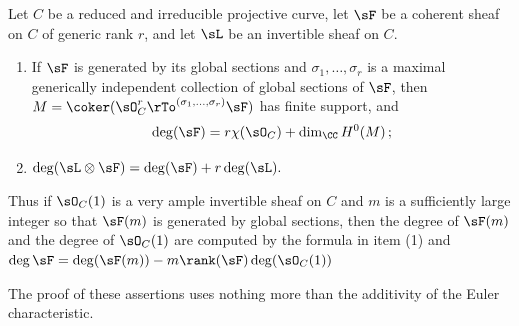 \begin{fact} Let $C$ be a reduced and irreducible projective curve, let $\sF$ be a coherent sheaf on $C$ of generic rank $r$, and let $\sL$ be an invertible sheaf on $C$.
\begin{enumerate}
\item If $\sF$ is generated by its global sections and $\sigma_1,\dots, \sigma_r$ is a maximal generically independent
collection of global sections of $\sF$,  then $M = \coker(\sO_C^r \rTo^{(\sigma_1,\dots, \sigma_r)}\sF)$
has finite support, and
$$
\deg (\sF) = r \chi(\sO_C)+
\dim_\CC H^0(M)\,;
$$

\item $\deg (\sL \otimes \sF) = \deg (\sF) +r\deg (\sL).$

\end{enumerate}
Thus if $\sO_C(1)$ is a very ample invertible sheaf on $C$ and $m$ is a sufficiently large integer so that
$\sF(m)$ is generated by global sections, then the degree of $\sF(m)$ and the degree of $\sO_C(1)$ are computed by the formula in item (1)
and $\deg \sF = \deg(\sF(m)) - m \rank(\sF) \deg (\sO_C(1))$

The proof of these assertions uses nothing more than the additivity of the Euler characteristic.
\end{fact}
%
%
%


